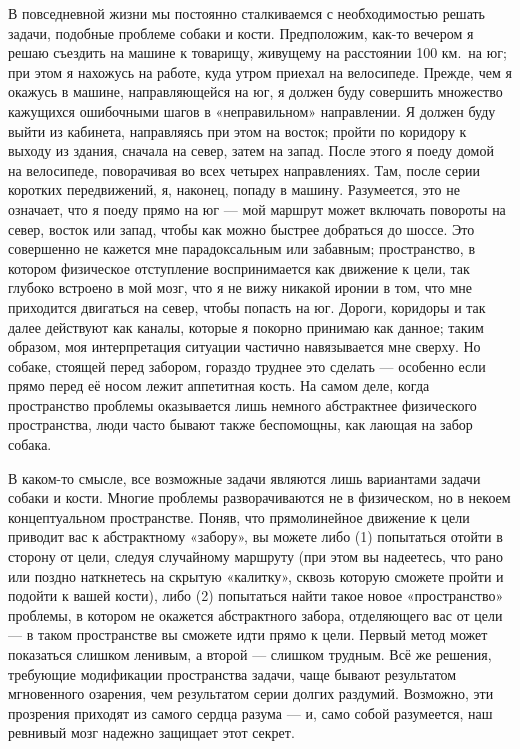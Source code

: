 \documentclass[../main.tex]{subfiles}
\begin{document}
В повседневной жизни мы постоянно сталкиваемся с необходимостью решать задачи, подобные проблеме собаки и кости. Предположим, как-то вечером я решаю съездить на машине к товарищу, живущему на расстоянии 100 км.\ на юг; при этом я нахожусь на работе, куда утром приехал на велосипеде. Прежде, чем я окажусь в машине, направляющейся на юг, я должен буду совершить множество кажущихся ошибочными шагов в «неправильном» направлении. Я должен буду выйти из кабинета, направляясь при этом на восток; пройти по коридору к выходу из здания, сначала на север, затем на запад. После этого я поеду домой на велосипеде, поворачивая во всех четырех направлениях. Там, после серии коротких передвижений, я, наконец, попаду в машину. Разумеется, это не означает, что я поеду прямо на юг --- мой маршрут может включать повороты на север, восток или запад, чтобы как можно быстрее добраться до шоссе. Это совершенно не кажется мне парадоксальным или забавным; пространство, в котором физическое отступление воспринимается как движение к цели, так глубоко встроено в мой мозг, что я не вижу никакой иронии в том, что мне приходится двигаться на север, чтобы попасть на юг. Дороги, коридоры и так далее действуют как каналы, которые я покорно принимаю как данное; таким образом, моя интерпретация ситуации частично навязывается мне сверху. Но собаке, стоящей перед забором, гораздо труднее это сделать --- особенно если прямо перед её носом лежит аппетитная кость. На самом деле, когда пространство проблемы оказывается лишь немного абстрактнее физического пространства, люди часто бывают также беспомощны, как лающая на забор собака.

В каком-то смысле, все возможные задачи являются лишь вариантами задачи собаки и кости. Многие проблемы разворачиваются не в физическом, но в некоем концептуальном пространстве. Поняв, что прямолинейное движение к цели приводит вас к абстрактному «забору», вы можете либо (1) попытаться отойти в сторону от цели, следуя случайному маршруту (при этом вы надеетесь, что рано или поздно наткнетесь на скрытую «калитку», сквозь которую сможете пройти и подойти к вашей кости), либо (2) попытаться найти такое новое «пространство» проблемы, в котором не окажется абстрактного забора, отделяющего вас от цели --- в таком пространстве вы сможете идти прямо к цели. Первый метод может показаться слишком ленивым, а второй --- слишком трудным. Всё же решения, требующие модификации пространства задачи, чаще бывают результатом мгновенного озарения, чем результатом серии долгих раздумий. Возможно, эти прозрения приходят из самого сердца разума --- и, само собой разумеется, наш ревнивый мозг надежно защищает этот секрет.
\end{document}
